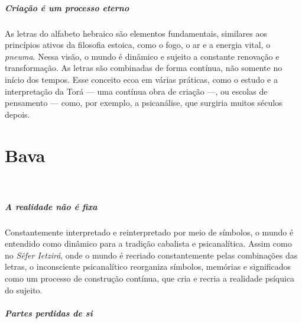 \paragraph{Criação é um processo eterno} As letras do alfabeto hebraico são elementos fundamentais, similares aos princípios ativos da filosofia estoica, como o fogo, o ar e a energia vital, o \textit{pneuma}. Nessa visão, o mundo é dinâmico e sujeito a constante renovação e transformação. As letras são combinadas de forma contínua, não somente no início dos tempos. Esse conceito ecoa em várias práticas, como o estudo e a interpretação da Torá --- uma contínua obra de criação ---, ou escolas de pensamento --- como, por exemplo, a psicanálise, que surgiria muitos séculos depois.

\chapter*{Bava 
\smallskip{}}

\begin{center}
{\huge{}}\\\medskip{\footnotesize\formularlight{
\lipsum[2]
}}
\end{center}

\paragraph{A realidade não é fixa} Constantemente interpretado e reinterpretado por meio de símbolos, o mundo é entendido como dinâmico para a tradição cabalista e psicanalítica. Assim como no \textit{Sêfer Ietzirá}, onde o mundo é recriado constantemente pelas combinações das letras, o inconsciente psicanalítico reorganiza símbolos, memórias e significados como um processo de construção contínua, que cria e recria a realidade psíquica do sujeito. 

\paragraph{Partes perdidas de si} 

